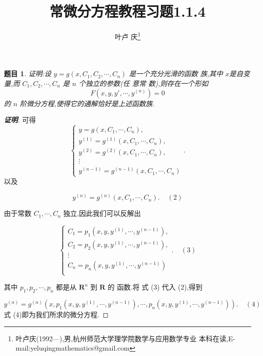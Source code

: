 \documentclass[a4paper]{article}
\newtheorem*{exe}{题目}
\newenvironment{exercise}
{\bigskip\begin{mdframed}\begin{exe}}
    {\end{exe}\end{mdframed}\bigskip}
\begin{document}
\title{\huge{\bf{常微分方程教程习题1.1.4}}} \author{\small{叶卢
    庆\footnote{叶卢庆(1992---),男,杭州师范大学理学院数学与应用数学专业
      本科在读,E-mail:yeluqingmathematics@gmail.com}}}
\maketitle
\begin{exercise}
  证明:设 $ y=g(x,C_1,C_2,\cdots,C_n)$ 是一个充分光滑的函数 族,其中 $
  x$是自变量,而 $ C_1,C_2,\cdots,C_n$ 是 $ n$ 个独立的参数(任 意常
  数),则存在一个形如
$$F(x,y,y',\cdots,y^{(n)})=0$$
的 $ n$ 阶微分方程,使得它的通解恰好是上述函数族.
\end{exercise}
\begin{proof}[\textbf{证明}]
  可得
  \begin{equation}\begin{cases} y=g(x,C_1,\cdots,C_n),\\
      y^{(1)}=g^{(1)}(x,C_1,\cdots,C_n),\\
      y^{(2)}=g^{(2)}(x,C_1,\cdots,C_n),\\ \vdots\\
      y^{(n-1)}=g^{(n-1)}(x,C_1,\cdots,C_n) \end{cases}. 
    \end{equation}
  以及

  $$ {\displaystyle y^{(n)}=g^{(n)}(x,C_1,\cdots,C_n). \ \ \ \ \ (2)}$$

  由于常数 $ C_1,\cdots,C_n$ 独立,因此我们可以反解出

  $$ {\displaystyle \begin{cases}
      C_1=p_1(x,y,y^{(1)},\cdots,y^{(n-1)}),\\
      C_2=p_2(x,y,y^{(1)},\cdots,y^{(n-1)}),\\ \vdots\\
      C_n=p_n(x,y,y^{(1)},\cdots,y^{(n-1)})\\ \end{cases}. \ \ \ \ \
    (3)}$$

  其中 $ p_1,p_2,\cdots,p_n$ 都是从 $ \mathbf{R}^n$ 到 $ \mathbf{R}$ 的
  函数.将 式 (3) 代入 (2),得到

  $$ {\displaystyle
    y^{(n)}=g^{(n)}(x,p_1(x,y,y^{(1)},\cdots,y^{(n-1)}),\cdots,p_n(x,y,y^{(1)},\cdots,y^{(n-1)})). \
    \ \ \ \ (4)}$$式 (4)即为我们所求的微分方程.
\end{proof}
\end{document}
